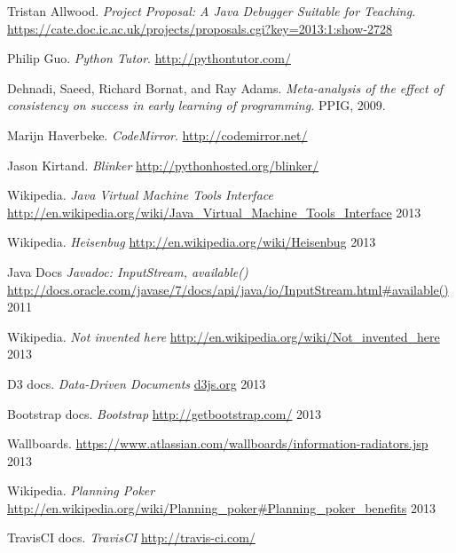 \documentclass[11pt, a4paper]{article}
\begin{document}
\begin{thebibliography}{9}

	Tristan Allwood.
	\emph{Project Proposal: A Java Debugger Suitable for Teaching}.
	\url{https://cate.doc.ic.ac.uk/projects/proposals.cgi?key=2013:1:show-2728}

	Philip Guo.
	\emph{Python Tutor}.
	\url{http://pythontutor.com/}

	Dehnadi, Saeed, Richard Bornat, and Ray Adams.
	\emph{Meta-analysis of the effect of consistency on success in early learning of programming.}
	PPIG, 2009.

	Marijn Haverbeke.
	\emph{CodeMirror}.
	\url{http://codemirror.net/}

        Jason Kirtand.
        \emph{Blinker}
        \url{http://pythonhosted.org/blinker/}

        Wikipedia.
        \emph{Java Virtual Machine Tools Interface}
        \url{http://en.wikipedia.org/wiki/Java_Virtual_Machine_Tools_Interface}
        2013

        Wikipedia.
        \emph{Heisenbug}
        \url{http://en.wikipedia.org/wiki/Heisenbug}
        2013

        Java Docs
        \emph{Javadoc: InputStream, available()}
        \url{http://docs.oracle.com/javase/7/docs/api/java/io/InputStream.html#available()}
        2011

        Wikipedia.
        \emph{Not invented here}
        \url{http://en.wikipedia.org/wiki/Not_invented_here}
        2013

        D3 docs.
        \emph{Data-Driven Documents}
        \url{d3js.org}
        2013

        Bootstrap docs.
        \emph{Bootstrap}
        \url{http://getbootstrap.com/}
        2013

        Wallboards.
        \url{https://www.atlassian.com/wallboards/information-radiators.jsp}
        2013

        Wikipedia.
        \emph{Planning Poker}
        \url{http://en.wikipedia.org/wiki/Planning\_poker\#Planning\_poker\_benefits}
        2013

        TravisCI docs.
        \emph{TravisCI}
        \url{http://travis-ci.com/}
        
\end{thebibliography}
\end{document}
